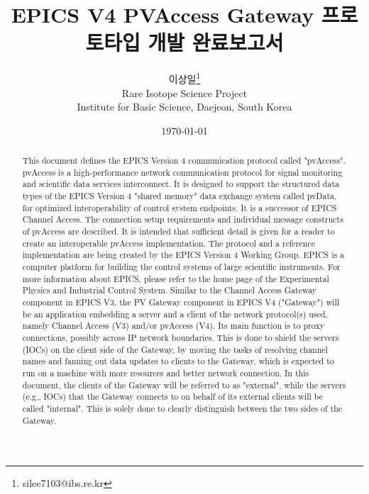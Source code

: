 \documentclass[11pt
  , a4paper
  , article
  , oneside
]{memoir}
\begin{document}
\newcommand{\technumber}{
  RAON Control-Document Series\\
  Revision : v1.0,   Release : 2016-12-02 fixed date}
\title{\textbf{EPICS V4 PVAccess Gateway 프로토타입 개발 완료보고서}}

\author{이상일\thanks{silee7103@ibs.re.kr} \\

  Rare Isotope Science Project\\
  Institute for Basic Science, Daejeon, South Korea
}
\date{\today}

\renewcommand{\maketitlehooka}{\begin{flushright}\textsf{\technumber}\end{flushright}}

\maketitle

\begin{abstract}
This document defines the EPICS Version 4 communication protocol called "pvAccess". pvAccess is a high-performance network communication protocol for signal monitoring and scientific data services interconnect. It is designed to support the structured data types of the EPICS Version 4 "shared memory" data exchange system called pvData, for optimized interoperability of control system endpoints. It is a successor of EPICS Channel Access. The connection setup requirements and individual message constructs of pvAccess are described. It is intended that sufficient detail is given for a reader to create an interoperable pvAccess implementation. The protocol and a reference implementation are being created by the EPICS Version 4 Working Group. EPICS is a computer platform for building the control systems of large scientific instruments. For more information about EPICS, please refer to the home page of the Experimental Physics and Industrial Control System. Similar to the Channel Access Gateway component in EPICS V3, the PV Gateway component in EPICS V4 ("Gateway") will be an application embedding a server and a client of the network protocol(s) used, namely Channel Access (V3) and/or pvAccess (V4). Its main function is to proxy connections, possibly across IP network boundaries. This is done to shield the servers (IOCs) on the client side of the Gateway, by moving the tasks of resolving channel names and fanning out data updates to clients to the Gateway, which is expected to run on a machine with more resources and better network connection. In this document, the clients of the Gateway will be referred to as "external", while the servers (e.g., IOCs) that the Gateway connects to on behalf of its external clients will be called "internal". This is solely done to clearly distinguish between the two sides of the Gateway.
\end{abstract}
\end{document}
